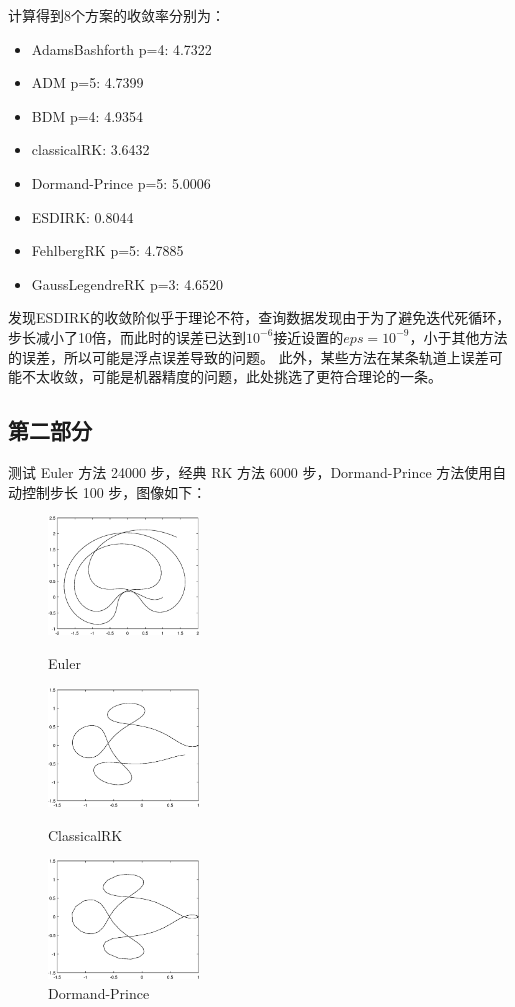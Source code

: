 \documentclass[12]{article}%
\begin{document}
计算得到8个方案的收敛率分别为：
\begin{itemize}
    \item AdamsBashforth p=4: 4.7322
    \item ADM p=5: 4.7399
    \item BDM p=4: 4.9354
    \item classicalRK: 3.6432
    \item Dormand-Prince p=5: 5.0006
    \item ESDIRK: 0.8044
    \item FehlbergRK p=5: 4.7885
    \item GaussLegendreRK p=3: 4.6520
\end{itemize}

发现ESDIRK的收敛阶似乎于理论不符，查询数据发现由于为了避免迭代死循环，步长减小了10倍，而此时的误差已达到$10^{-6}$接近设置的$eps=10^{-9}$，小于其他方法的误差，所以可能是浮点误差导致的问题。
此外，某些方法在某条轨道上误差可能不太收敛，可能是机器精度的问题，此处挑选了更符合理论的一条。

\subsection{第二部分}
测试 Euler 方法 24000 步，经典 RK 方法 6000 步，Dormand-Prince 方法使用自动控制步长 100 步，图像如下：

\begin{figure}[H]
    \centering
    \begin{minipage}[t]{0.3\textwidth}
    \centering
    \includegraphics[width=4cm]{../pic/Euler.eps}
    \caption{Euler}
    \end{minipage}
    \begin{minipage}[t]{0.3\textwidth}
    \centering
    \includegraphics[width=4cm]{../pic/RK6000.eps}
    \caption{ClassicalRK}
    \end{minipage}
    \begin{minipage}[t]{0.3\textwidth}
    \centering
    \includegraphics[width=4cm]{../pic/Dormand-Prince.eps}
    \caption{Dormand-Prince }
    \end{minipage}
\end{figure}
\end{document}
